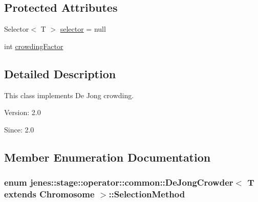 \subsection*{Protected Attributes}
\begin{CompactItemize}
\item 
Selector$<$ T $>$ \hyperlink{classjenes_1_1stage_1_1operator_1_1common_1_1_de_jong_crowder_3_01_t_01extends_01_chromosome_01_4_6486b0225d345afd81b86dd04772d5ba}{selector} = null
\item 
int \hyperlink{classjenes_1_1stage_1_1operator_1_1common_1_1_de_jong_crowder_3_01_t_01extends_01_chromosome_01_4_d876594787797e723425c09d74d0a05d}{crowdingFactor}
\end{CompactItemize}


\subsection{Detailed Description}
This class implements De Jong crowding.

\begin{Desc}
\item[Version:]2.0 \end{Desc}
\begin{Desc}
\item[Since:]2.0 \end{Desc}


\subsection{Member Enumeration Documentation}
\hypertarget{classjenes_1_1stage_1_1operator_1_1common_1_1_de_jong_crowder_3_01_t_01extends_01_chromosome_01_4_4c04a136973e222068a9b2bad6593645}{
\subsubsection[SelectionMethod]{\setlength{\rightskip}{0pt plus 5cm}enum jenes::stage::operator::common::DeJongCrowder$<$ T extends Chromosome $>$::{\bf SelectionMethod}}}
\label{classjenes_1_1stage_1_1operator_1_1common_1_1_de_jong_crowder_3_01_t_01extends_01_chromosome_01_4_4c04a136973e222068a9b2bad6593645}


